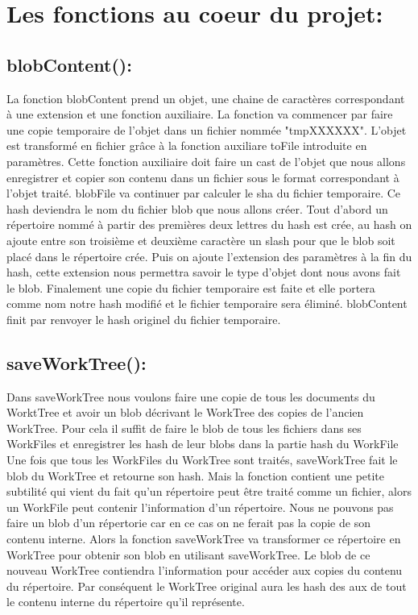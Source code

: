 \documentclass[11pt,francais]{article}
\begin{document}
\section{Les fonctions au coeur du projet:}
\subsection{blobContent():}
	La fonction blobContent prend un objet, une chaine de caractères correspondant à une extension et une fonction auxiliaire. La fonction va commencer par faire une copie temporaire de l'objet dans un fichier nommée  "tmpXXXXXX".  L'objet est transformé en fichier grâce à la fonction auxiliare toFile introduite en paramètres. Cette fonction auxiliaire doit faire un cast de l'objet que nous allons enregistrer et copier son contenu dans un fichier sous le format correspondant à l'objet traité. blobFile va continuer par calculer le sha du fichier temporaire. Ce hash deviendra le nom du fichier blob que nous allons créer. Tout d'abord  un répertoire nommé à partir des premières deux lettres du hash est crée, au hash on ajoute entre son troisième et deuxième caractère un slash pour que le blob soit placé dans le répertoire crée. Puis on ajoute l'extension des paramètres à la fin du hash, cette extension nous permettra savoir le type d'objet dont nous avons fait le blob. Finalement une copie du fichier temporaire est faite et elle portera comme nom notre hash modifié et le fichier temporaire sera éliminé. blobContent finit par renvoyer le hash originel du fichier temporaire.
\subsection{saveWorkTree():}
	Dans saveWorkTree nous voulons faire une copie de tous les documents du WorktTree et avoir un blob décrivant le WorkTree des copies de l'ancien WorkTree. Pour cela il suffit de faire le blob de tous les fichiers dans ses WorkFiles et enregistrer les hash de leur blobs dans la partie hash du WorkFile Une fois que tous les WorkFiles du WorkTree sont traités, saveWorkTree fait le blob du WorkTree et retourne son hash.
	 Mais la fonction contient une petite subtilité qui vient du fait qu'un répertoire peut être traité comme un fichier, alors un WorkFile peut contenir l'information d'un répertoire. Nous ne pouvons pas faire un blob d'un répertorie car en ce cas on ne ferait pas la copie de son contenu interne. Alors la fonction saveWorkTree va transformer ce répertoire en WorkTree pour obtenir son blob en utilisant saveWorkTree.  Le blob  de ce nouveau WorkTree contiendra l'information pour accéder aux copies du contenu du répertoire.
Par conséquent le WorkTree original aura les hash des aux de tout le contenu interne du répertoire qu'il représente.
	
\end{document}
